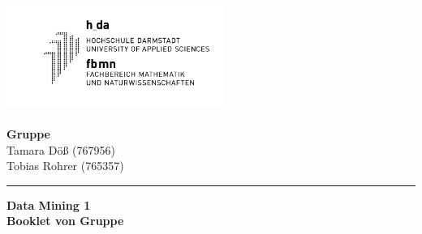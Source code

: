 \hspace{-1.4cm}
\parbox[b][80pt][b]{80pt}{
	\includegraphics[width=200pt,height=100pt]{Bilder/hda_fbmn.png}}
\hfill
\parbox[b][75pt][t]{260pt}{
	\hspace*{\fill}\textbf{Gruppe \Gruppe} \\ 
	\hspace*{\fill} Tamara Döß (767956) \\
	\hspace*{\fill} Tobias Rohrer (765357)\\
	\hspace*{\fill} }
\vspace{-0.2cm}
\hrule
\vspace{5mm}
\begin{center}
	{\bf\huge Data Mining 1\\[10mm]}
	{\bf \large Booklet von Gruppe \Gruppe}
\end{center}
\vspace{1cm}
\tableofcontents
\pagebreak
\addtocounter{secnumdepth}{-1}
